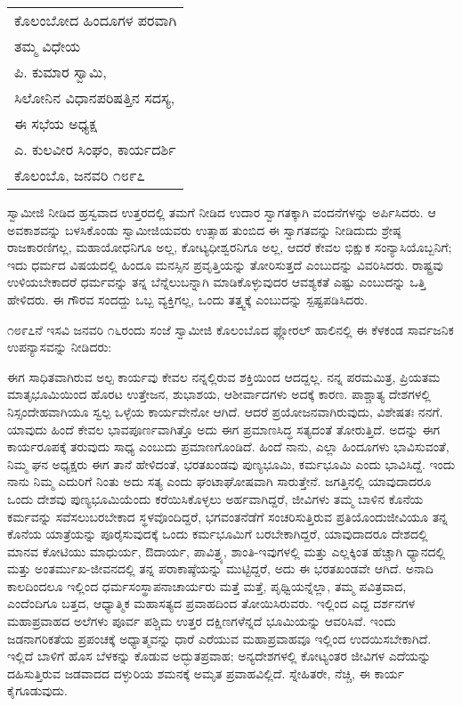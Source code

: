 \begin{longtable}[r]{@{}l@{}}
ಕೊಲಂಬೋದ ಹಿಂದೂಗಳ ಪರವಾಗಿ \\
ತಮ್ಮ ವಿಧೇಯ \\
ಪಿ. ಕುಮಾರ ಸ್ವಾಮಿ, \\
ಸಿಲೋನಿನ ವಿಧಾನಪರಿಷತ್ತಿನ ಸದಸ್ಯ, \\
ಈ ಸಭೆಯ ಅಧ್ಯಕ್ಷ \\
ಎ. ಕುಲವೀರ ಸಿಂಘಂ, ಕಾರ್ಯದರ್ಶಿ \\
ಕೊಲಂಬೊ, ಜನವರಿ ೧೮೯೭ \\
\end{longtable}

ಸ್ವಾಮೀಜಿ ನೀಡಿದ ಹ್ರಸ್ವವಾದ ಉತ್ತರದಲ್ಲಿ ತಮಗೆ ನೀಡಿದ ಉದಾರ ಸ್ವಾಗತಕ್ಕಾಗಿ ವಂದನೆಗಳನ್ನು ಅರ್ಪಿಸಿದರು. ಆ ಅವಕಾಶವನ್ನು ಬಳಸಿಕೊಂಡು ಸ್ವಾಮೀಜಿಯವರು ಉತ್ಸಾಹ ತುಂಬಿದ ಈ ಸ್ವಾಗತವನ್ನು ನೀಡಿದುದು ಶ್ರೇಷ್ಠ ರಾಜಕಾರಣಿಗಲ್ಲ, ಮಹಾಯೋಧನಿಗೂ ಅಲ್ಲ, ಕೋಟ್ಯಧೀಶ್ವರನಿಗೂ ಅಲ್ಲ, ಆದರೆ ಕೇವಲ ಭಿಕ್ಷುಕ ಸಂನ್ಯಾಸಿಯೊಬ್ಬನಿಗೆ; ಇದು ಧರ್ಮದ ವಿಷಯದಲ್ಲಿ ಹಿಂದೂ ಮನಸ್ಸಿನ ಪ್ರವೃತ್ತಿಯನ್ನು ತೋರಿಸುತ್ತದೆ ಎಂಬುದನ್ನು ವಿವರಿಸಿದರು. ರಾಷ್ಟ್ರವು ಉಳಿಯಬೇಕಾದರೆ ಧರ್ಮವನ್ನು ತನ್ನ ಬೆನ್ನೆಲುಬನ್ನಾಗಿ ಮಾಡಿಕೊಳ್ಳುವುದರ ಆವಶ್ಯಕತೆ ಎಷ್ಟು ಎಂಬುದನ್ನು ಒತ್ತಿ ಹೇಳಿದರು. ಈ ಗೌರವ ಸಂದದ್ದು ಒಬ್ಬ ವ್ಯಕ್ತಿಗಲ್ಲ, ಒಂದು ತತ್ತ್ವಕ್ಕೆ ಎಂಬುದನ್ನು ಸ್ಪಷ್ಟಪಡಿಸಿದರು.

೧೮೯೭ನೆ ಇಸವಿ ಜನವರಿ ೧೬ರಂದು ಸಂಜೆ ಸ್ವಾಮೀಜಿ ಕೊಲಂಬೊದ ಫ್ಲೋರಲ್​ ಹಾಲಿನಲ್ಲಿ ಈ ಕೆಳಕಂಡ ಸಾರ್ವಜನಿಕ ಉಪನ್ಯಾಸವನ್ನು ನೀಡಿದರು:

ಈಗ ಸಾಧಿತವಾಗಿರುವ ಅಲ್ಪ ಕಾರ್ಯವು ಕೇವಲ ನನ್ನಲ್ಲಿರುವ ಶಕ್ತಿಯಿಂದ ಆದದ್ದಲ್ಲ. ನನ್ನ ಪರಮಮಿತ್ರ, ಪ್ರಿಯತಮ ಮಾತೃಭೂಮಿಯಿಂದ ಹೊರಟ ಉತ್ತೇಜನ, ಶುಭಾಶಯ, ಆಶೀರ್ವಾದಗಳು ಅದಕ್ಕೆ ಕಾರಣ. ಪಾಶ್ಚಾತ್ಯ ದೇಶಗಳಲ್ಲಿ ನಿಸ್ಸಂದೇಹವಾಗಿಯೂ ಸ್ವಲ್ಪ ಒಳ್ಳೆಯ ಕಾರ್ಯವೇನೋ ಆಗಿದೆ. ಆದರೆ ಪ್ರಯೋಜನವಾಗಿರುವುದು, ವಿಶೇಷತಃ ನನಗೆ. ಯಾವುದು ಹಿಂದೆ ಕೇವಲ ಭಾವಪೂರ್ಣವಾಗಿತ್ತೊ ಅದು ಈಗ ಪ್ರಮಾಣಸಿದ್ಧ ಸತ್ಯದಂತೆ ತೋರುತ್ತಿದೆ. ಅದನ್ನು ಈಗ ಕಾರ್ಯರೂಪಕ್ಕೆ ತರುವುದು ಸಾಧ್ಯ ಎಂಬುದು ಪ್ರಮಾಣಗೊಂಡಿದೆ. ಹಿಂದೆ ನಾನು, ಎಲ್ಲಾ ಹಿಂದೂಗಳು ಭಾವಿಸುವಂತೆ, ನಿಮ್ಮ ಘನ ಅಧ್ಯಕ್ಷರು ಈಗ ತಾನೆ ಹೇಳಿದಂತೆ, ಭರತಖಂಡವು ಪುಣ್ಯಭೂಮಿ, ಕರ್ಮಭೂಮಿ ಎಂದು ಭಾವಿಸಿದ್ದೆ. ಇಂದು ನಾನು ನಿಮ್ಮ ಎದುರಿಗೆ ನಿಂತು ಅದು ಸತ್ಯ ಎಂದು ಘಂಟಾಘೋಷವಾಗಿ ಸಾರುತ್ತೇನೆ. ಜಗತ್ತಿನಲ್ಲಿ ಯಾವುದಾದರೂ ಒಂದು ದೇಶವು ಪುಣ್ಯಭೂಮಿಯೆಂದು ಕರೆಯಿಸಿಕೊಳ್ಳಲು ಅರ್ಹವಾಗಿದ್ದರೆ, ಜೀವಿಗಳು ತಮ್ಮ ಬಾಳಿನ ಕೊನೆಯ ಕರ್ಮವನ್ನು ಸವೆಸಲು\break ಬರಬೇಕಾದ ಸ್ಥಳವೊಂದಿದ್ದರೆ, ಭಗವಂತನೆಡೆಗೆ ಸಂಚರಿಸುತ್ತಿರುವ ಪ್ರತಿಯೊಂದು\break ಜೀವಿಯೂ ತನ್ನ ಕೊನೆಯ ಯಾತ್ರೆಯನ್ನು ಪೂರೈಸುವುದಕ್ಕೆ ಒಂದು ಕರ್ಮಭೂಮಿಗೆ ಬರಬೇಕಾಗಿದ್ದರೆ, ಯಾವುದಾದರೂ ದೇಶದಲ್ಲಿ ಮಾನವ ಕೋಟಿಯು ಮಾಧುರ್ಯ, ಔದಾರ್ಯ, ಪಾವಿತ್ರ್ಯ, ಶಾಂತಿ-ಇವುಗಳಲ್ಲಿ ಮತ್ತು ಎಲ್ಲಕ್ಕಿಂತ ಹೆಚ್ಚಾಗಿ ಧ್ಯಾನದಲ್ಲಿ ಮತ್ತು ಅಂತರ್ಮುಖ-ಜೀವನದಲ್ಲಿ ತನ್ನ ಪರಾಕಾಷ್ಠೆಯನ್ನು ಮುಟ್ಟಿದ್ದರೆ, ಅದು ಈ ಭರತಖಂಡವೇ ಆಗಿದೆ. ಅನಾದಿ ಕಾಲದಿಂದಲೂ ಇಲ್ಲಿಂದ ಧರ್ಮಸಂಸ್ಥಾಪನಾಚಾರ್ಯರು ಮತ್ತೆ ಮತ್ತೆ, ಪೃಥ್ವಿಯನ್ನೆಲ್ಲಾ, ತಮ್ಮ ಪವಿತ್ರವಾದ, ಎಂದೆಂದಿಗೂ ಬತ್ತದ, ಆಧ್ಯಾತ್ಮಿಕ ಮಹಾಸತ್ಯದ ಪ್ರವಾಹದಿಂದ ತೋಯಿಸಿರುವರು. ಇಲ್ಲಿಂದ ಎದ್ದ ದರ್ಶನಗಳ ಮಹಾಪ್ರವಾಹದ ಅಲೆಗಳು ಪೂರ್ವ ಪಶ್ಚಿಮ ಉತ್ತರ ದಕ್ಷಿಣಗಳೆನ್ನದೆ ಭೂಮಿಯನ್ನು ಆವರಿಸಿವೆ. ಇಂದು ಜಡನಾಗರಿಕತೆಯ ಪ್ರಪಂಚಕ್ಕೆ ಅಧ್ಯಾತ್ಮವನ್ನು ಧಾರೆ ಎರೆಯುವ ಮಹಾಪ್ರವಾಹವೂ ಇಲ್ಲಿಂದ ಉದಯಿಸಬೇಕಾಗಿದೆ. ಇಲ್ಲಿದೆ ಬಾಳಿಗೆ ಹೊಸ ಬೆಳಕನ್ನು ಕೊಡುವ ಅದ್ಭುತಪ್ರವಾಹ; ಅನ್ಯದೇಶಗಳಲ್ಲಿ ಕೋಟ್ಯಂತರ ಜೀವಿಗಳ ಎದೆಯನ್ನು ದಹಿಸುತ್ತಿರುವ ಜಡವಾದದ ದಳ್ಳುರಿಯ ಶಮನಕ್ಕೆ ಅಮೃತ ಪ್ರವಾಹವಿಲ್ಲಿದೆ. ಸ್ನೇಹಿತರೇ, ನೆಚ್ಚಿ, ಈ ಕಾರ್ಯ ಕೈಗೂಡುವುದು.

